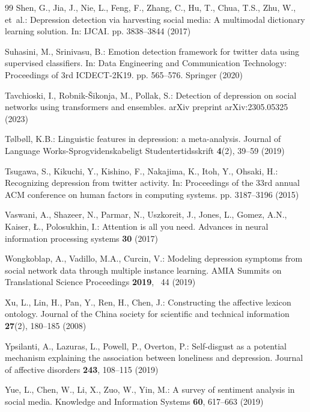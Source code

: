 \documentclass[runningheads]{llncs}
\begin{document}
\begin{thebibliography}{99}
Shen, G., Jia, J., Nie, L., Feng, F., Zhang, C., Hu, T., Chua, T.S., Zhu, W.,
  et~al.: Depression detection via harvesting social media: A multimodal
  dictionary learning solution. In: IJCAI. pp. 3838--3844 (2017)

Suhasini, M., Srinivasu, B.: Emotion detection framework for twitter data using
  supervised classifiers. In: Data Engineering and Communication Technology:
  Proceedings of 3rd ICDECT-2K19. pp. 565--576. Springer (2020)

Tavchioski, I., Robnik-{\v{S}}ikonja, M., Pollak, S.: Detection of depression
  on social networks using transformers and ensembles. arXiv preprint
  arXiv:2305.05325  (2023)

T{\o}lb{\o}ll, K.B.: Linguistic features in depression: a meta-analysis.
  Journal of Language Works-Sprogvidenskabeligt Studentertidsskrift
  \textbf{4}(2),  39--59 (2019)

Tsugawa, S., Kikuchi, Y., Kishino, F., Nakajima, K., Itoh, Y., Ohsaki, H.:
  Recognizing depression from twitter activity. In: Proceedings of the 33rd
  annual ACM conference on human factors in computing systems. pp. 3187--3196
  (2015)

Vaswani, A., Shazeer, N., Parmar, N., Uszkoreit, J., Jones, L., Gomez, A.N.,
  Kaiser, {\L}., Polosukhin, I.: Attention is all you need. Advances in neural
  information processing systems  \textbf{30} (2017)

Wongkoblap, A., Vadillo, M.A., Curcin, V.: Modeling depression symptoms from
  social network data through multiple instance learning. AMIA Summits on
  Translational Science Proceedings  \textbf{2019}, ~44 (2019)

Xu, L., Lin, H., Pan, Y., Ren, H., Chen, J.: Constructing the affective lexicon
  ontology. Journal of the China society for scientific and technical
  information  \textbf{27}(2),  180--185 (2008)

Ypsilanti, A., Lazuras, L., Powell, P., Overton, P.: Self-disgust as a
  potential mechanism explaining the association between loneliness and
  depression. Journal of affective disorders  \textbf{243},  108--115 (2019)

Yue, L., Chen, W., Li, X., Zuo, W., Yin, M.: A survey of sentiment analysis in
  social media. Knowledge and Information Systems  \textbf{60},  617--663
  (2019)


\end{thebibliography}
\end{document}
